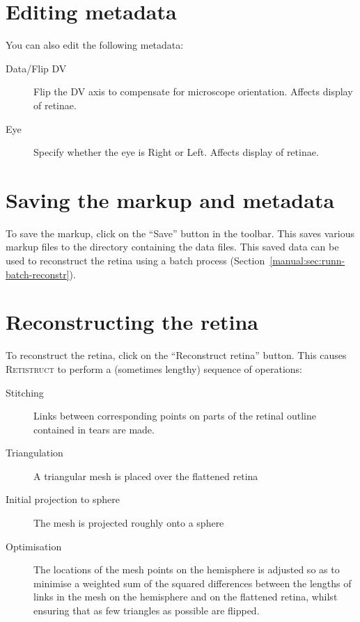 \documentclass{book}
\begin{document}
\section{Editing metadata}
\label{retistruct-manual:sec:metadata}

You can also edit the following metadata:

\begin{description}
\item[Data/Flip DV] Flip the DV axis to compensate for microscope
  orientation. Affects display of retinae.
\item[Eye] Specify whether the eye is Right or Left.  Affects display
  of retinae.
\end{description}

\section{Saving the markup and metadata}
\label{manual:sec:saving-markup}

To save the markup, click on the ``Save'' button in the toolbar. This
saves various markup files to the directory containing the
data files. This saved data can be used to reconstruct the retina using
a batch process (Section~\ref{manual:sec:runn-batch-reconstr}).

\section{Reconstructing the retina}
\label{manual:sec:reconstr-retina}

To reconstruct the retina, click on the ``Reconstruct retina'' button.
This causes \textsc{Retistruct} to perform a (sometimes lengthy)
sequence of operations:
\begin{description}
\item[Stitching] Links between corresponding points on parts of the retinal
  outline  contained in tears are made.
\item[Triangulation] A triangular mesh is placed over the flattened retina
\item[Initial projection to sphere ] The mesh is projected roughly
  onto a sphere
\item[Optimisation] The locations of the mesh points on the hemisphere
  is adjusted so as to minimise a weighted sum of the squared
  differences between the lengths of links in the mesh on the
  hemisphere and on the flattened retina, whilst ensuring that as few
  triangles as possible are flipped.
\end{description}
\end{document}
